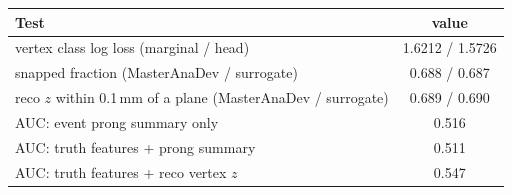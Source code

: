 \begin{tabular}{lc}
\toprule
Test & value \\
\midrule
vertex class log loss (marginal / head) & 1.6212 / 1.5726 \\
snapped fraction (MasterAnaDev / surrogate) & 0.688 / 0.687 \\
reco $z$ within 0.1\,mm of a plane (MasterAnaDev / surrogate) & 0.689 / 0.690 \\
\midrule
AUC: event prong summary only & 0.516 \\
AUC: truth features + prong summary & 0.511 \\
AUC: truth features + reco vertex $z$ & 0.547 \\
\bottomrule
\end{tabular}
